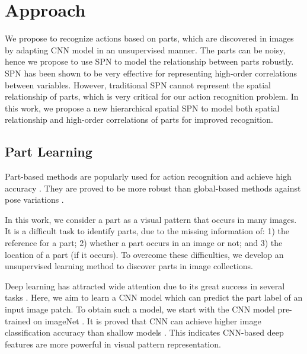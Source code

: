 \documentclass[journal]{IEEEtran}
\begin{document}
\section{Approach}
\label{Sec:Approach}


We propose to recognize actions based on parts, which are discovered in images by adapting CNN model in an unsupervised manner. The parts can be noisy, hence we propose to use SPN to model the relationship between parts robustly.
SPN \cite{poon2011SPNIntroduce} has been shown to be very effective for representing high-order correlations between variables. However, traditional SPN cannot represent the spatial relationship of parts, which is very critical for our action recognition problem. In this work, we propose a new hierarchical spatial SPN to model both spatial relationship and high-order correlations of parts for improved recognition.



\subsection{Part Learning}
\label{section_part_learning}

Part-based methods \cite{liuting} are popularly used for action recognition and achieve high accuracy \cite{YangWMCVPR10,MajiActionCVPR11,YiYangCVPR2011:APE:2191740.2192012,Yao11humanaction__Stanford40,sharma:CVPR2013,Shahroudy2015Multimodal}.
They are proved to be more robust than global-based methods against pose variations \cite{YangWMCVPR10,FelzenszwalbMR_CVPR_2008}.


In this work, we consider a part as a visual pattern that occurs in many images. It is a difficult task to identify parts, due to the missing information of: 1) the reference for a part; 2) whether a part occurs in an image or not; and 3) the location of a part (if it occurs). To overcome these difficulties, we develop an unsupervised learning method to discover parts in image collections.


Deep learning has attracted wide attention due to its great success in several tasks \cite{Zuo2015Learning,Shuai2016Scene}. Here, we aim to learn a CNN model which can predict the part label of an input image patch.
To obtain such a model, we start with the CNN model pre-trained on imageNet \cite{CNN__NIPS2012_4824,jia2014caffe}. It is proved that CNN can achieve higher image classification accuracy than shallow models \cite{CNN__NIPS2012_4824}. This indicates CNN-based deep features are more powerful in visual pattern representation.
\end{document}
